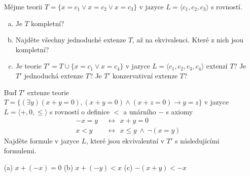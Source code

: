 \begin{problem}

    Mějme teorii $T=\{x=c_1 \vee x=c_2 \vee x=c_3\}$ v jazyce $L=\langle c_1,c_2,c_3\rangle$ s rovností.
    \begin{enumerate}[(a)]     
        \item Je $T$ kompletní?
        \item Najděte všechny jednoduché extenze $T$, až na ekvivalenci. Které z nich jsou kompletní?
        \item Je teorie $T'=T\cup\{x=c_1 \vee x=c_4\}$ v jazyce $L=\langle c_1,c_2,c_3,c_4\rangle$ extenzí $T$? Je $T'$ jednoduchá extenze $T$? Je $T'$ konzervativní extenze $T$?
    \end{enumerate}

    \begin{solution}
                    
    \end{solution}

\end{problem}


\begin{problem}

    Buď $T'$ extenze teorie $T=\{(\exists y)(x+y=0),(x+y=0)\wedge (x+z=0)\rightarrow y=z\}$ v jazyce $L=\langle +,0,\le\rangle$ s rovností o definice $<$ a unárního $-$ s axiomy
    \begin{align*}
        -x=y\ \ &\leftrightarrow\ \ x+y=0\\
        x<y\ \ &\leftrightarrow\ \ x\le y\ \wedge\ \neg(x=y)
    \end{align*}
    Najděte formule v jazyce $L$, které jsou ekvivalentní v $T'$ s následujícími formulemi.
        
    (a) $x+(-x)=0$ \hfill (b) $x+(-y)<x$ \hfill (c) $-(x+y)<-x$\hfill{}

    \begin{solution}
                    
    \end{solution}
    
\end{problem}


